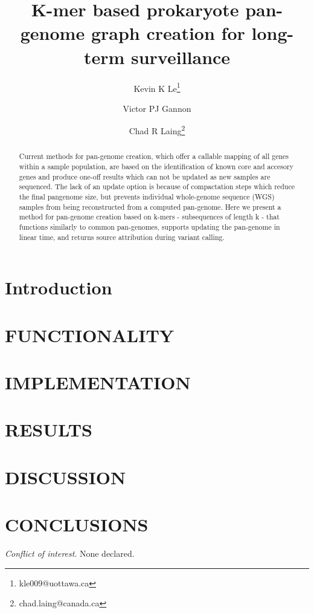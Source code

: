 \documentclass{article}
\begin{document}
\title{K-mer based prokaryote pan-genome graph creation for long-term surveillance}

\author[1]{Kevin K Le\thanks{kle009@uottawa.ca}}
\author[1]{Victor PJ Gannon}
\author[2]{Chad R Laing\thanks{chad.laing@canada.ca}}

\renewcommand\Authands{ and }

\maketitle

\begin{abstract}

Current methods for pan-genome creation, which offer a callable mapping of all genes within a sample population, are based on the identification of known core and accesory genes and produce one-off results which can not be updated as new samples are sequenced.
The lack of an update option is because of compactation steps which reduce the final pangenome size, but prevents individual whole-genome sequence (WGS) samples from being reconstructed from a computed pan-genome.
Here we present a method for pan-genome creation based on k-mers - subsequences of length k - that functions similarly to common pan-genomes, supports updating the pan-genome in linear time, and returns source attribution during variant calling.


\end{abstract}


\section{Introduction}


\enlargethispage{-65.1pt}

\section{FUNCTIONALITY}


\section{IMPLEMENTATION}

\section{RESULTS}

\section{DISCUSSION}


\section{CONCLUSIONS}


\textit{Conflict of interest}. None declared.

\newpage



\end{document}
